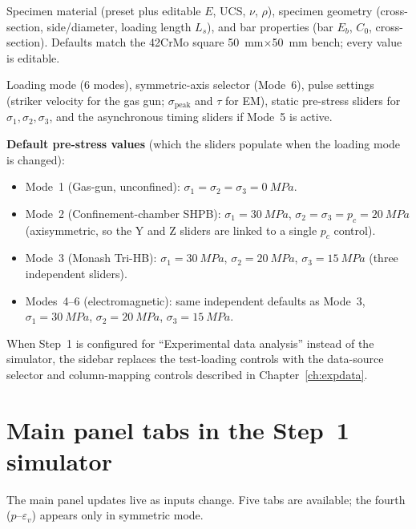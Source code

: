 \documentclass[11pt,a4paper,openany]{book}
\providecommand{\SI}[2]{\qty{#1}{#2}}
\theoremstyle{handbook}
\newcommand{\sig}{\sigma}
\newcommand{\eps}{\varepsilon}
\newcommand{\Cz}{C_0}
\newcommand{\Ls}{L_s}
\newcommand{\sigpeak}{\sig_{\text{peak}}}
\begin{document}
\begin{description}[leftmargin=2em,style=nextline]
  \item[Experimental setup]
    Specimen material (preset plus editable $E$, UCS, $\nu$, $\rho$),
    specimen geometry (cross-section, side/diameter, loading length
    $\Ls$), and bar properties (bar $E_b$, $\Cz$, cross-section).
    Defaults match the 42CrMo square \SI{50}{mm}$\times$\SI{50}{mm}
    bench; every value is editable.
  \item[Test loading]
    Loading mode (6 modes), symmetric-axis selector (Mode~6), pulse
    settings (striker velocity for the gas gun; $\sigpeak$ and $\tau$ for
    EM), static pre-stress sliders for $\sig_1,\sig_2,\sig_3$, and the
    asynchronous timing sliders if Mode~5 is active.

    \medskip\noindent
    \textbf{Default pre-stress values} (which the sliders populate when
    the loading mode is changed):
    \begin{itemize}[leftmargin=1.5em,itemsep=2pt]
      \item Mode~1 (Gas-gun, unconfined):
            $\sig_1=\sig_2=\sig_3=\SI{0}{MPa}$.
      \item Mode~2 (Confinement-chamber SHPB):
            $\sig_1=\SI{30}{MPa}$, $\sig_2=\sig_3=p_c=\SI{20}{MPa}$
            (axisymmetric, so the Y and Z sliders are linked to a
            single $p_c$ control).
      \item Mode~3 (Monash Tri-HB):
            $\sig_1=\SI{30}{MPa}$, $\sig_2=\SI{20}{MPa}$,
            $\sig_3=\SI{15}{MPa}$ (three independent sliders).
      \item Modes~4--6 (electromagnetic): same independent defaults as
            Mode~3, $\sig_1=\SI{30}{MPa}$, $\sig_2=\SI{20}{MPa}$,
            $\sig_3=\SI{15}{MPa}$.
    \end{itemize}
\end{description}

When Step~1 is configured for ``Experimental data analysis'' instead of
the simulator, the sidebar replaces the test-loading controls with the
data-source selector and column-mapping controls described in
Chapter~\ref{ch:expdata}.

\section{Main panel tabs in the Step~1 simulator}

The main panel updates live as inputs change. Five tabs are available;
the fourth ($p$--$\eps_v$) appears only in symmetric mode.
\end{document}
